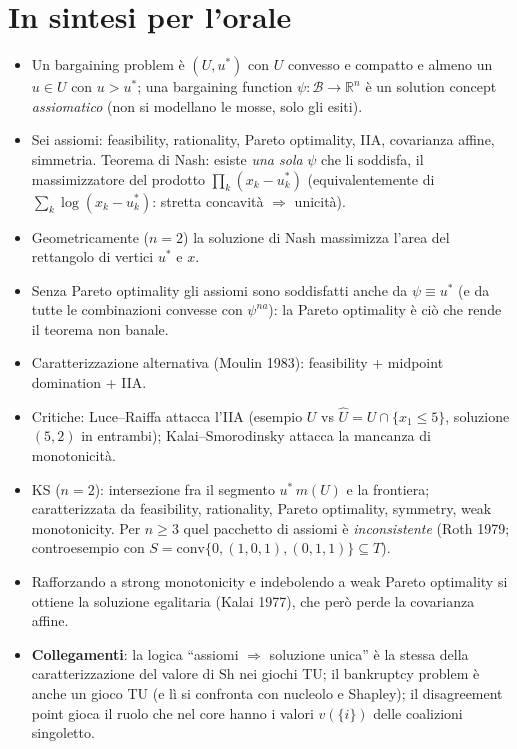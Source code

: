 \documentclass[12pt,a4paper,twoside]{book}
\theoremstyle{plain}
\theoremstyle{definition}
\newcommand{\Sh}{\mathrm{Sh}}
\begin{document}
\section*{In sintesi per l'orale}
\begin{itemize}
  \item Un bargaining problem è $(U,u^*)$ con $U$ convesso e compatto e almeno un $u\in U$
        con $u>u^*$; una bargaining function $\psi:\mathcal{B}\to\mathbb{R}^n$ è un solution
        concept \emph{assiomatico} (non si modellano le mosse, solo gli esiti).
  \item Sei assiomi: feasibility, rationality, Pareto optimality, IIA, covarianza affine,
        simmetria. Teorema di Nash: esiste \emph{una sola} $\psi$ che li soddisfa, il
        massimizzatore del prodotto $\prod_k(x_k-u^*_k)$ (equivalentemente di
        $\sum_k\log(x_k-u^*_k)$: stretta concavità $\Rightarrow$ unicità).
  \item Geometricamente ($n=2$) la soluzione di Nash massimizza l'area del rettangolo di
        vertici $u^*$ e $x$.
  \item Senza Pareto optimality gli assiomi sono soddisfatti anche da $\psi\equiv u^*$ (e da
        tutte le combinazioni convesse con $\psi^{na}$): la Pareto optimality è ciò che
        rende il teorema non banale.
  \item Caratterizzazione alternativa (Moulin 1983): feasibility + midpoint domination + IIA.
  \item Critiche: Luce--Raiffa attacca l'IIA (esempio $U$ vs $\widehat U=U\cap\{x_1\le5\}$,
        soluzione $(5,2)$ in entrambi); Kalai--Smorodinsky attacca la mancanza di monotonicità.
  \item KS ($n=2$): intersezione fra il segmento $u^*\,m(U)$ e la frontiera; caratterizzata da
        feasibility, rationality, Pareto optimality, symmetry, weak monotonicity. Per $n\ge3$
        quel pacchetto di assiomi è \emph{inconsistente} (Roth 1979; controesempio con
        $S=\mathrm{conv}\{0,(1,0,1),(0,1,1)\}\subseteq T$).
  \item Rafforzando a strong monotonicity e indebolendo a weak Pareto optimality si ottiene la
        soluzione egalitaria (Kalai 1977), che però perde la covarianza affine.
  \item \textbf{Collegamenti}: la logica ``assiomi $\Rightarrow$ soluzione unica'' è la stessa
        della caratterizzazione del valore di $\Sh$ nei giochi TU; il bankruptcy problem è
        anche un gioco TU (e lì si confronta con nucleolo e Shapley); il disagreement point
        gioca il ruolo che nel core hanno i valori $v(\{i\})$ delle coalizioni singoletto.
\end{itemize}
\end{document}

